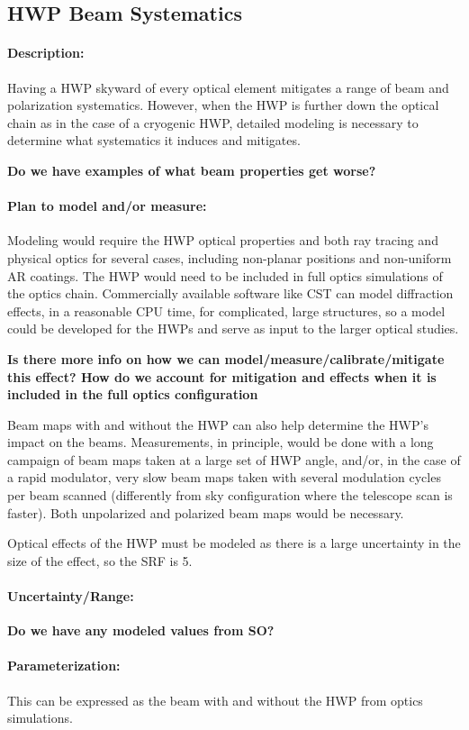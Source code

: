 
\subsection{HWP Beam Systematics}


\paragraph{Description:}
Having a HWP skyward of every optical element mitigates a range of beam and polarization systematics. However, when the HWP is further down the optical chain as in the case of a cryogenic HWP, detailed modeling is necessary to determine what systematics it induces and mitigates.

\textbf{Do we have examples of what beam properties get worse?}

\paragraph{Plan to model and/or measure:}
Modeling would require the HWP optical properties and both ray tracing and physical optics for several cases, including non-planar positions and non-uniform AR coatings. The HWP would need to be included in full optics simulations of the optics chain. Commercially available software like CST can model diffraction effects, in a reasonable CPU time, for complicated, large structures, so a model could be developed for the HWPs and serve as input to the larger optical studies.

\textbf{Is there more info on how we can model/measure/calibrate/mitigate this effect? How do we account for mitigation and effects when it is included in the full optics configuration}

Beam maps with and without the HWP can also help determine the HWP's impact on the beams. Measurements, in principle, would be done with a long campaign of beam maps taken at a large set of HWP angle, and/or, in the case of a rapid modulator, very slow beam maps taken with several modulation cycles per beam scanned (differently from sky configuration where the telescope scan is faster). Both unpolarized and polarized beam maps would be necessary.

Optical effects of the HWP must be modeled as there is a large uncertainty in the size of the effect, so the SRF is 5.

\paragraph{Uncertainty/Range:}
\textbf{Do we have any modeled values from SO?}

\paragraph{Parameterization:}
This can be expressed as the beam with and without the HWP from optics simulations.
